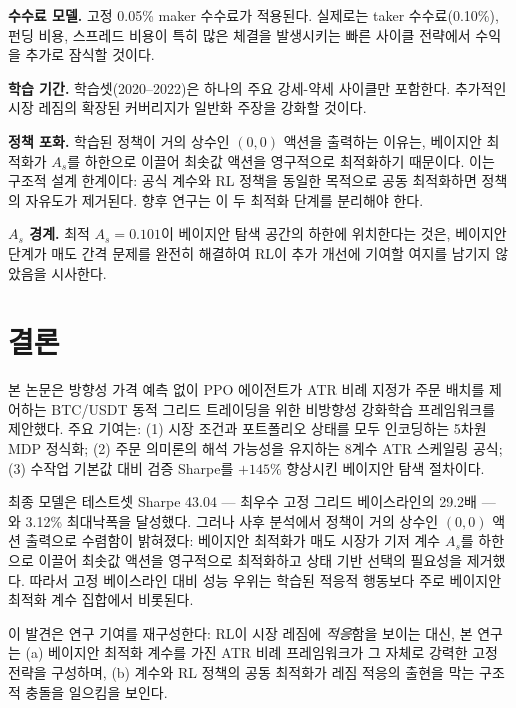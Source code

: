 \documentclass[11pt, a4paper]{article}
\begin{document}
\textbf{수수료 모델.}
고정 0.05\% maker 수수료가 적용된다.
실제로는 taker 수수료(0.10\%), 펀딩 비용, 스프레드 비용이 특히 많은 체결을
발생시키는 빠른 사이클 전략에서 수익을 추가로 잠식할 것이다.

\textbf{학습 기간.}
학습셋(2020--2022)은 하나의 주요 강세-약세 사이클만 포함한다.
추가적인 시장 레짐의 확장된 커버리지가 일반화 주장을 강화할 것이다.

\textbf{정책 포화.}
학습된 정책이 거의 상수인 $(0, 0)$ 액션을 출력하는 이유는, 베이지안 최적화가
$A_s$를 하한으로 이끌어 최솟값 액션을 영구적으로 최적화하기 때문이다.
이는 구조적 설계 한계이다: 공식 계수와 RL 정책을 동일한 목적으로 공동 최적화하면
정책의 자유도가 제거된다.
향후 연구는 이 두 최적화 단계를 분리해야 한다.

\textbf{$A_s$ 경계.}
최적 $A_s = 0.101$이 베이지안 탐색 공간의 하한에 위치한다는 것은,
베이지안 단계가 매도 간격 문제를 완전히 해결하여 RL이 추가 개선에 기여할
여지를 남기지 않았음을 시사한다.

\section{결론}
\label{sec:conclusion}

본 논문은 방향성 가격 예측 없이 PPO 에이전트가 ATR 비례 지정가 주문 배치를 제어하는
BTC/USDT 동적 그리드 트레이딩을 위한 비방향성 강화학습 프레임워크를 제안했다.
주요 기여는: (1) 시장 조건과 포트폴리오 상태를 모두 인코딩하는 5차원 MDP 정식화;
(2) 주문 의미론의 해석 가능성을 유지하는 8계수 ATR 스케일링 공식;
(3) 수작업 기본값 대비 검증 Sharpe를 $+145\%$ 향상시킨 베이지안 탐색 절차이다.

최종 모델은 테스트셋 Sharpe 43.04 — 최우수 고정 그리드 베이스라인의 29.2배 —
와 3.12\% 최대낙폭을 달성했다.
그러나 사후 분석에서 정책이 거의 상수인 $(0, 0)$ 액션 출력으로 수렴함이 밝혀졌다:
베이지안 최적화가 매도 시장가 기저 계수 $A_s$를 하한으로 이끌어 최솟값 액션을
영구적으로 최적화하고 상태 기반 선택의 필요성을 제거했다.
따라서 고정 베이스라인 대비 성능 우위는 학습된 적응적 행동보다 주로
베이지안 최적화 계수 집합에서 비롯된다.

이 발견은 연구 기여를 재구성한다: RL이 시장 레짐에 \emph{적응}함을 보이는 대신,
본 연구는 (a) 베이지안 최적화 계수를 가진 ATR 비례 프레임워크가 그 자체로
강력한 고정 전략을 구성하며, (b) 계수와 RL 정책의 공동 최적화가 레짐 적응의
출현을 막는 구조적 충돌을 일으킴을 보인다.
\end{document}
